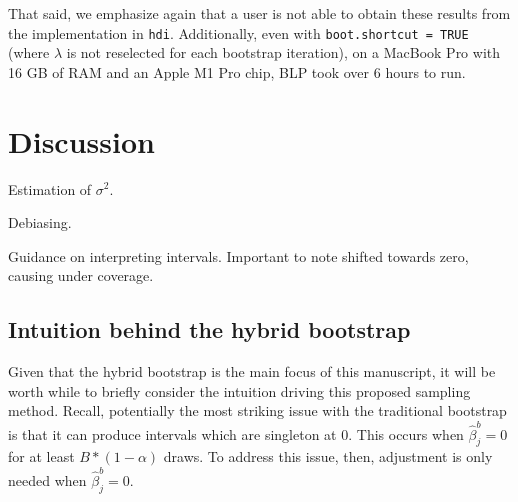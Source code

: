 That said, we emphasize again that a user is not able to obtain these results from the implementation in \texttt{hdi}. Additionally, even with \texttt{boot.shortcut = TRUE} (where $\lambda$ is not reselected for each bootstrap iteration), on a MacBook Pro with 16 GB of RAM and an Apple M1 Pro chip, BLP took over 6 hours to run. 

\section{Discussion}


Estimation of $\sigma^2$.  

Debiasing.

Guidance on interpreting intervals. Important to note shifted towards zero, causing under coverage.

\subsection{Intuition behind the hybrid bootstrap}

Given that the hybrid bootstrap is the main focus of this manuscript, it will be worth while to briefly consider the intuition driving this proposed sampling method. Recall, potentially the most striking issue with the traditional bootstrap is that it can produce intervals which are singleton at 0. This occurs when $\hat{\beta}_j^b = 0$ for at least $B * (1 - \alpha)$ draws. To address this issue, then, adjustment is only needed when $\hat{\beta}_j^{b} = 0$. 

